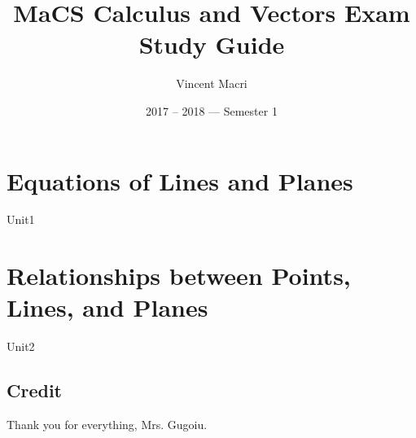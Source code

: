 \documentclass[letterpaper,12pt]{report}
\title{MaCS Calculus and Vectors Exam Study Guide}
\author{Vincent Macri}
\date{2017 -- 2018 --- Semester 1}
\begin{document}
	\maketitle
	\clearpage
	\tableofcontents
	\clearpage

	\part{Equations of Lines and Planes}
		{Unit1}
	\part{Relationships between Points, Lines, and Planes}
		{Unit2}
	
	\appendix
	\chapter{Credit}
	Thank you for everything, Mrs. Gugoiu.
\end{document}
